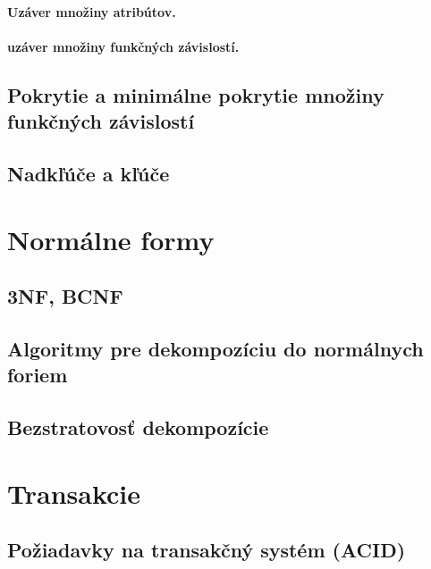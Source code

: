 \documentclass[10pt,a4paper]{article}
\begin{document}
\paragraph{Uzáver množiny atribútov.}
\paragraph{uzáver množiny funkčných závislostí.}

\subsection{Pokrytie a minimálne pokrytie množiny funkčných závislostí}
\subsection{Nadkľúče a kľúče}
    
\section{Normálne formy} 
\subsection{3NF, BCNF}
\subsection{Algoritmy pre dekompozíciu do normálnych foriem}
\subsection{Bezstratovosť dekompozície}
    
\section{Transakcie} 
\subsection{Požiadavky na transakčný systém (ACID)}
\end{document}
